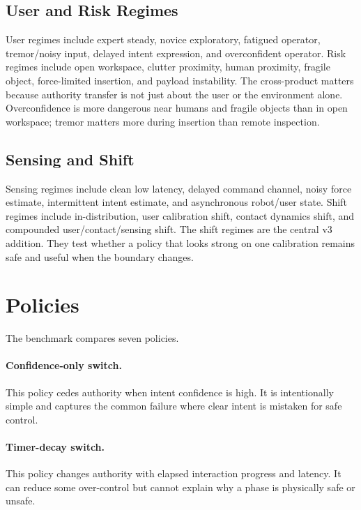 \documentclass{article}
\begin{document}
\subsection{User and Risk Regimes}

User regimes include expert steady, novice exploratory, fatigued operator, tremor/noisy input, delayed intent expression, and overconfident operator. Risk regimes include open workspace, clutter proximity, human proximity, fragile object, force-limited insertion, and payload instability. The cross-product matters because authority transfer is not just about the user or the environment alone. Overconfidence is more dangerous near humans and fragile objects than in open workspace; tremor matters more during insertion than remote inspection.

\subsection{Sensing and Shift}

Sensing regimes include clean low latency, delayed command channel, noisy force estimate, intermittent intent estimate, and asynchronous robot/user state. Shift regimes include in-distribution, user calibration shift, contact dynamics shift, and compounded user/contact/sensing shift. The shift regimes are the central v3 addition. They test whether a policy that looks strong on one calibration remains safe and useful when the boundary changes.

\section{Policies}

The benchmark compares seven policies.

\paragraph{Confidence-only switch.}
This policy cedes authority when intent confidence is high. It is intentionally simple and captures the common failure where clear intent is mistaken for safe control.

\paragraph{Timer-decay switch.}
This policy changes authority with elapsed interaction progress and latency. It can reduce some over-control but cannot explain why a phase is physically safe or unsafe.
\end{document}
